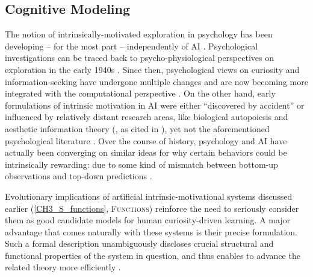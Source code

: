 \subsection{Cognitive Modeling}\label{CH3_SS_cognitive_modeling}
The notion of intrinsically-motivated exploration in psychology has been developing -- for the most part -- independently of AI \parencite{kaplan_search_2007}. Psychological investigations can be traced back to psycho-physiological perspectives on exploration in the early 1940s \parencite{hull_principles_1943}. Since then, psychological views on curiosity and information-seeking have undergone multiple changes \parencite{loewenstein_psychology_1994,bazhydai_curiosity_2020} and are now becoming more integrated with the computational perspective \parencite{kaplan_search_2007,gottlieb_information-seeking_2013}. On the other hand, early formulations of intrinsic motivation in AI were either “discovered by accident” \parencite[p. 5]{andreae_thinking_1977} or influenced by relatively distant research areas, like biological autopoiesis \parencite{maturana_autopoiesis_1980} and aesthetic information theory (\cite{nake_asthetik_1974}, as cited in \cite{schmidhuber_possibility_1991}), yet not the aforementioned psychological literature \parencite[see][for a historical overview]{kaplan_search_2007}. Over the course of history, psychology and AI have actually been converging on similar ideas for why certain behaviors could be intrinsically rewarding: due to some kind of mismatch between bottom-up observations and top-down predictions \parencite{kaplan_search_2007}.

Evolutionary implications of artificial intrinsic-motivational systems discussed earlier (\cref{CH3_S_functions}, \textsc{Functions}) reinforce the need to seriously consider them as good candidate models for human curiosity-driven learning. A major advantage that comes naturally with these systems is their precise formulation. Such a formal description unambiguously discloses crucial structural and functional properties of the system in question, and thus enables to advance the related theory more efficiently \parencite{mcclelland_place_2009}. 

